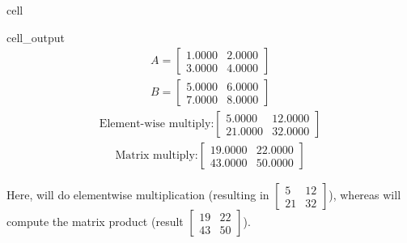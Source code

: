 \documentclass[letterpaper,10pt,english]{jupyterBook}
\begin{document}
\begin{sphinxuseclass}{cell}
\begin{sphinxVerbatimOutput}
\begin{sphinxuseclass}{cell_output}\begin{equation*}
\begin{split}\displaystyle A=\left[
\begin{array}{}
  1.0000 &  2.0000\\
  3.0000 &  4.0000
\end{array}
\right]\end{split}
\end{equation*}\begin{equation*}
\begin{split}\displaystyle B=\left[
\begin{array}{}
  5.0000 &  6.0000\\
  7.0000 &  8.0000
\end{array}
\right]\end{split}
\end{equation*}\begin{equation*}
\begin{split}\displaystyle \text{Element-wise multiply:}\left[
\begin{array}{}
  5.0000 &  12.0000\\
  21.0000 &  32.0000
\end{array}
\right]\end{split}
\end{equation*}\begin{equation*}
\begin{split}\displaystyle \text{Matrix multiply:}\left[
\begin{array}{}
  19.0000 &  22.0000\\
  43.0000 &  50.0000
\end{array}
\right]\end{split}
\end{equation*}
\end{sphinxuseclass}\end{sphinxVerbatimOutput}

\end{sphinxuseclass}
\sphinxAtStartPar
Here,  will do element\sphinxhyphen{}wise multiplication (resulting in \(\begin{bmatrix}5&12\\21&32\end{bmatrix}\)), whereas  will compute the matrix product (result \(\begin{bmatrix}19&22\\43&50\end{bmatrix}\)).
\end{document}
